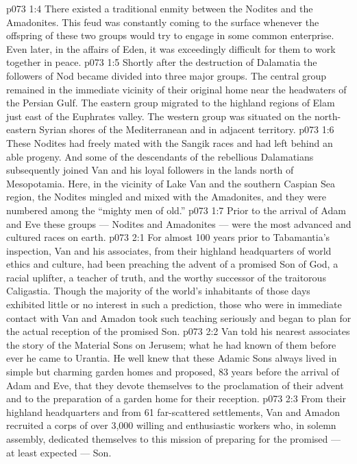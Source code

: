 \vs p073 1:4 There existed a traditional enmity between the Nodites and the Amadonites. This feud was constantly coming to the surface whenever the offspring of these two groups would try to engage in some common enterprise. Even later, in the affairs of Eden, it was exceedingly difficult for them to work together in peace.
\vs p073 1:5 Shortly after the destruction of Dalamatia the followers of Nod became divided into three major groups. The central group remained in the immediate vicinity of their original home near the headwaters of the Persian Gulf. The eastern group migrated to the highland regions of Elam just east of the Euphrates valley. The western group was situated on the north\hyp{}eastern Syrian shores of the Mediterranean and in adjacent territory.
\vs p073 1:6 These Nodites had freely mated with the Sangik races and had left behind an able progeny. And some of the descendants of the rebellious Dalamatians subsequently joined Van and his loyal followers in the lands north of Mesopotamia. Here, in the vicinity of Lake Van and the southern Caspian Sea region, the Nodites mingled and mixed with the Amadonites, and they were numbered among the “mighty men of old.”
\vs p073 1:7 Prior to the arrival of Adam and Eve these groups --- Nodites and Amadonites --- were the most advanced and cultured races on earth.
\vs p073 2:1 For almost 100 years prior to Tabamantia’s inspection, Van and his associates, from their highland headquarters of world ethics and culture, had been preaching the advent of a promised Son of God, a racial uplifter, a teacher of truth, and the worthy successor of the traitorous Caligastia. Though the majority of the world’s inhabitants of those days exhibited little or no interest in such a prediction, those who were in immediate contact with Van and Amadon took such teaching seriously and began to plan for the actual reception of the promised Son.
\vs p073 2:2 Van told his nearest associates the story of the Material Sons on Jerusem; what he had known of them before ever he came to Urantia. He well knew that these Adamic Sons always lived in simple but charming garden homes and proposed, 83 years before the arrival of Adam and Eve, that they devote themselves to the proclamation of their advent and to the preparation of a garden home for their reception.
\vs p073 2:3 From their highland headquarters and from 61 far\hyp{}scattered settlements, Van and Amadon recruited a corps of over 3,000 willing and enthusiastic workers who, in solemn assembly, dedicated themselves to this mission of preparing for the promised --- at least expected --- Son.

